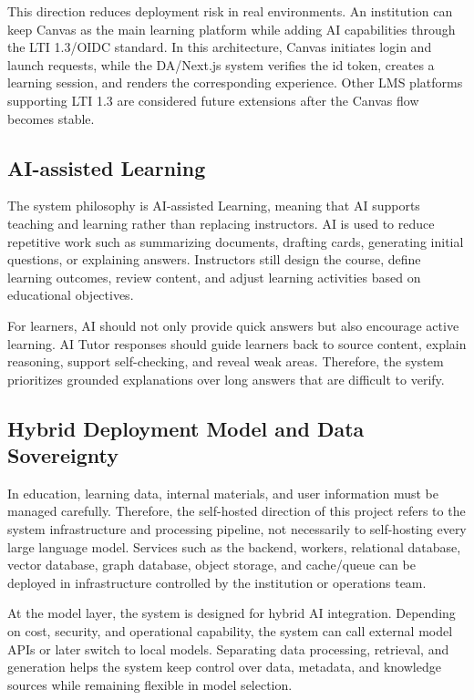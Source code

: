 This direction reduces deployment risk in real environments. An institution
can keep Canvas as the main learning platform while adding AI capabilities
through the LTI 1.3/OIDC standard. In this architecture, Canvas initiates login
and launch requests, while the DA/Next.js system verifies the id token, creates
a learning session, and renders the corresponding experience. Other LMS
platforms supporting LTI 1.3 are considered future extensions after the Canvas
flow becomes stable.

\subsection{AI-assisted Learning}

The system philosophy is AI-assisted Learning, meaning that AI supports
teaching and learning rather than replacing instructors. AI is used to reduce
repetitive work such as summarizing documents, drafting cards, generating
initial questions, or explaining answers. Instructors still design the course,
define learning outcomes, review content, and adjust learning activities based
on educational objectives.

For learners, AI should not only provide quick answers but also encourage
active learning. AI Tutor responses should guide learners back to source
content, explain reasoning, support self-checking, and reveal weak areas.
Therefore, the system prioritizes grounded explanations over long answers that
are difficult to verify.

\subsection{Hybrid Deployment Model and Data Sovereignty}

In education, learning data, internal materials, and user information must be
managed carefully. Therefore, the self-hosted direction of this project refers
to the system infrastructure and processing pipeline, not necessarily to
self-hosting every large language model. Services such as the backend, workers,
relational database, vector database, graph database, object storage, and
cache/queue can be deployed in infrastructure controlled by the institution or
operations team.

At the model layer, the system is designed for hybrid AI integration. Depending
on cost, security, and operational capability, the system can call external
model APIs or later switch to local models. Separating data processing,
retrieval, and generation helps the system keep control over data, metadata,
and knowledge sources while remaining flexible in model selection.

